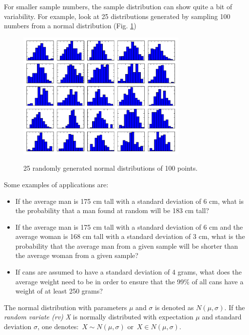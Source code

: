 For smaller sample numbers, the sample distribution can show quite a bit of variability. For example, look at 25 distributions generated by sampling 100 numbers from a normal distribution (Fig. \ref{fig:MultipleNormal})

\begin{figure}[h]
  \centering
  \includegraphics[width=0.75\textwidth]{../Images/Normal_MultHist.png}\\
  \caption{25 randomly generated normal distributions of 100 points.}\label{fig:MultipleNormal}
\end{figure}

Some examples of applications are:

\begin{itemize}
    \item{}If the average man is 175 cm tall with a standard deviation of 6 cm, what is the probability that a man found at random will be 183 cm tall?
    \item{}If the average man is 175 cm tall with a standard deviation of 6 cm and the average woman is 168 cm tall with a standard deviation of 3 cm, what is the probability that the average man from a given sample will be shorter than the average woman from a given sample?
    \item{}If cans are assumed to have a standard deviation of 4 grams, what does the average weight need to be in order to ensure that the 99\% of all cans have a weight of at least 250 grams?
\end{itemize}

The normal distribution with parameters $\mu$ and $\sigma$ is denoted as {$N(\mu,\sigma)$}. If the \emph{random variate (rv)} {\itshape X} is normally distributed with expectation $\mu$ and standard deviation $\sigma$, one denotes: {$\,X \sim N(\mu,\sigma)$} or $\,X \in N(\mu,\sigma)$.

